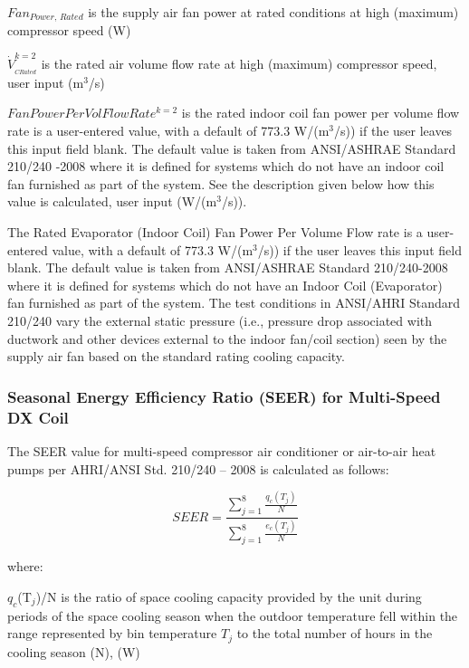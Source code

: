 \(Fa{n_{Power,\,Rated}}\) is the supply air fan power at rated conditions at high (maximum) compressor speed (W)

\(\dot V_{_{CRated}}^{k = 2}\) is the rated air volume flow rate at high (maximum) compressor speed, user input (m\(^{3}\)/s)

\(FanPowerPerVolFlowRat{e^{k = 2}}\) is the rated indoor coil fan power per volume flow rate is a user-entered value, with a default of 773.3 W/(m\(^{3}\)/s)) if the user leaves this input field blank. The default value is taken from ANSI/ASHRAE Standard 210/240 -2008 where it is defined for systems which do not have an indoor coil fan furnished as part of the system. See the description given below how this value is calculated, user input (W/(m\(^{3}\)/s)).

The Rated Evaporator (Indoor Coil) Fan Power Per Volume Flow rate is a user-entered value, with a default of 773.3 W/(m\(^{3}\)/s)) if the user leaves this input field blank. The default value is taken from ANSI/ASHRAE Standard 210/240-2008 where it is defined for systems which do not have an Indoor Coil (Evaporator) fan furnished as part of the system. The test conditions in ANSI/AHRI Standard 210/240 vary the external static pressure (i.e., pressure drop associated with ductwork and other devices external to the indoor fan/coil section) seen by the supply air fan based on the standard rating cooling capacity.

\subsubsection{Seasonal Energy Efficiency Ratio (SEER) for Multi-Speed DX Coil}\label{seasonal-energy-efficiency-ratio-seer-for-multi-speed-dx-coil}

The SEER value for multi-speed compressor air conditioner or air-to-air heat pumps per AHRI/ANSI Std. 210/240 -- 2008 is calculated as follows:

\begin{equation}
SEER = \frac{{\sum\limits_{j = 1}^8 {\frac{{{q_c}({T_j})}}{N}} }}{{\sum\limits_{j = 1}^8 {\frac{{{e_c}({T_j})}}{N}} }}
\end{equation}

where:

\(q_{c}\)(T\(_{j}\))/N is the ratio of space cooling capacity provided by the unit during periods of the space cooling season when the outdoor temperature fell within the range represented by bin temperature \(T_{j}\) to the total number of hours in the cooling season (N), (W)


